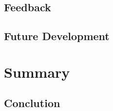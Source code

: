 \documentclass[BSP,english,oneside]{classes/gucthesis}
\begin{document}
	\section{Feedback}
		\label{sec:feedback}
		

	\section{Future Development}
		\label{sec:future_development}
		


\chapter{Summary}
	\label{chap:summary}

	\section{Conclution}
		\label{sec:conclution}
		
		
\printnoidxglossary[sort=word]







\label{STOP_SUMMARY_PAGECOUNT}

\clearpage
\appendix %
\addappheadtotoc
\appendixpage


\clearpage
\addtocounter{chapter}{1}


\clearpage
\addtocounter{chapter}{1}

\end{document}
